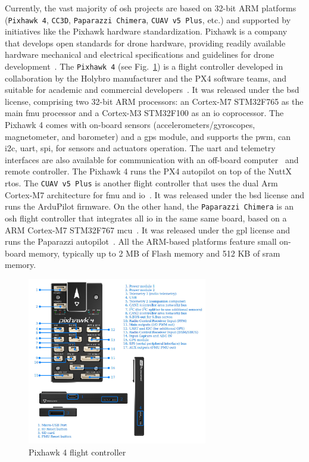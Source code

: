 Currently, the vast majority of \gls{osh} projects are based on 32-bit ARM platforms
(\lstinline{Pixhawk 4}, \lstinline{CC3D}, \lstinline{Paparazzi Chimera},
\lstinline{CUAV v5 Plus}, etc.) and supported by initiatives
like the Pixhawk hardware standardization. Pixhawk is a company that develops open
standards for drone hardware, providing readily available hardware
mechanical and electrical specifications and guidelines for drone development~\cite{pixhawk}.
%
The \lstinline{Pixhawk 4} (see Fig.~\ref{fig:osh-pixhawk4}) is a flight
controller developed in collaboration by the Holybro manufacturer and the PX4
software teams, and suitable for academic and commercial developers~\cite{pixhawk4}.
It was released under the \gls{bsd} license, comprising two 32-bit ARM
processors: an Cortex-M7 STM32F765 as the main \gls{fmu} processor and a
Cortex-M3 STM32F100 as an \gls{io} coprocessor. The Pixhawk 4 comes with
on-board sensors (accelerometers/gyroscopes, magnetometer, and barometer) and a
\gls{gps} module, and supports the \gls{pwm}, \gls{can} \gls{i2c}, \gls{uart},
\gls{spi}, for sensors and actuators operation. The \gls{uart} and telemetry
interfaces are also available for communication with an off-board
computer~\cite{pixhawk4} and remote controller. The Pixhawk 4 runs the PX4
autopilot on top of the NuttX \gls{rtos}.
%
The \lstinline{CUAV v5 Plus} is another flight controller that uses the dual Arm
Cortex-M7 architecture for \gls{fmu} and \gls{io}~\cite{arduPilot-cuavV5}. It
was released under the \gls{bsd} license and runs the ArduPilot
firmware. On the other hand, the \lstinline{Paparazzi Chimera} is an \gls{osh}
flight controller that integrates all \gls{io} in the same same board, based on
a ARM Cortex-M7 STM32F767 \gls{mcu}~\cite{paparazziChimera}. It was released
under the \gls{gpl} license and runs the Paparazzi
autopilot~\cite{paparazzi-github}. All the ARM-based platforms feature small
on-board memory, typically up to 2 MB of Flash memory and 512 KB of \gls{sram} memory.
  
\begin{figure}[!hbt]
  \centering
  \includegraphics[width=0.7\textwidth]{./img/jpg/osh-pixhawk4.jpg} 
  \caption[Pixhawk4 flight controller]{Pixhawk 4 flight controller~\cite{pixhawk4}\footnotemark}%
  \label{fig:osh-pixhawk4}
\end{figure}

